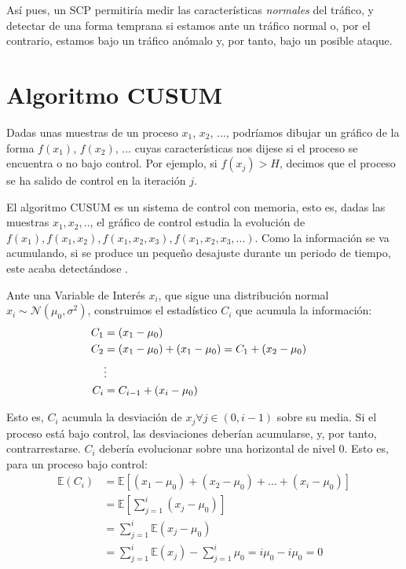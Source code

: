 Así pues, un \gls{SCP} permitiría medir las características \emph{normales} del 
tráfico, y detectar de una forma temprana si estamos ante un tráfico normal o, por el contrario, estamos bajo un 
tráfico anómalo y, por tanto, bajo un posible ataque.

\section{Algoritmo CUSUM}
Dadas unas muestras de un proceso $x_1$, $x_2$, ..., podríamos dibujar un gráfico de la forma $f(x_1)$, $f(x_2)$, ... 
cuyas características nos dijese si el proceso se encuentra o no bajo control. Por ejemplo, si $f(x_j) > H$, decimos que el proceso se ha salido de control en la iteración $j$.

El algoritmo \gls{CUSUM} es un sistema de control con memoria, esto 
es, dadas las muestras $x_1,x_2,..$, el gráfico de control estudia la evolución de 
$f(x_1),f(x_1,x_2),f(x_1,x_2,x_3),f(x_1,x_2,x_3,...)$. Como la información se va acumulando, si se produce un pequeño 
desajuste durante un periodo de tiempo, este acaba detectándose 
\cite{CUSUM_Carlos_III}.

Ante una Variable de Interés $x_i$, que sigue una distribución normal $x_i \sim\mathcal{N}\left(\mu_0,\sigma^2\right)$, 
construimos el estadístico $C_i$ que acumula la información:
\begin{align}
 C_1 &= (x_1 - \mu_0) \nonumber\\
 C_2 &= (x_1 - \mu_0) + (x_1 - \mu_0) = C_1 + (x_2-\mu_0) \nonumber\\
 &\vdots& \nonumber\\
 C_i &= C_{i-1} + (x_i-\mu_0) \LABEQ{CUSUM}
\end{align}

Esto es, $C_i$ acumula la desviación de $x_j \forall j\in(0,i-1)$ sobre su media. Si el proceso está bajo control, las 
desviaciones deberían acumularse, y, por tanto, contrarrestarse. $C_i$ debería evolucionar sobre una horizontal de 
nivel $0$. Esto es, para un proceso bajo control:
\begin{align}
 \mathbb{E}(C_i) &= \mathbb{E}\left[\left(x_1 - \mu_0\right) + \left(x_2-\mu_0\right)+\hdots
                                                                             +\left(x_i-\mu_0\right)\right] \nonumber\\
                 &= \mathbb{E}\left[\sum_{j=1}^i\left(x_j-\mu_0\right)\right]                               \nonumber\\
                 &= \sum_{j=1}^i\mathbb{E}\left(x_j-\mu_0\right)                                            \nonumber\\
                 &= \sum_{j=1}^i\mathbb{E}\left(x_j\right) - \sum_{j=1}^i\mu_0 = i\mu_0 - i\mu_0 = 0
 \end{align}

